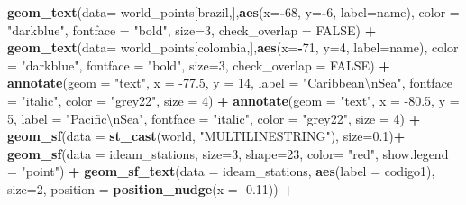 \documentclass[12pt,oneside]{reedthesis}
\newenvironment{Shaded}{\begin{snugshade}}{\end{snugshade}}
\newcommand{\CharTok}[1]{\textcolor[rgb]{0.31,0.60,0.02}{#1}}
\newcommand{\DataTypeTok}[1]{\textcolor[rgb]{0.13,0.29,0.53}{#1}}
\newcommand{\DecValTok}[1]{\textcolor[rgb]{0.00,0.00,0.81}{#1}}
\newcommand{\FloatTok}[1]{\textcolor[rgb]{0.00,0.00,0.81}{#1}}
\newcommand{\KeywordTok}[1]{\textcolor[rgb]{0.13,0.29,0.53}{\textbf{#1}}}
\newcommand{\NormalTok}[1]{#1}
\newcommand{\OperatorTok}[1]{\textcolor[rgb]{0.81,0.36,0.00}{\textbf{#1}}}
\newcommand{\OtherTok}[1]{\textcolor[rgb]{0.56,0.35,0.01}{#1}}
\newcommand{\StringTok}[1]{\textcolor[rgb]{0.31,0.60,0.02}{#1}}
\begin{document}
\begin{Shaded}
\begin{Highlighting}[]
{{{{\StringTok{  }\KeywordTok{geom_text}\NormalTok{(}\DataTypeTok{data=}\NormalTok{ world_points[brazil,],}\KeywordTok{aes}\NormalTok{(}\DataTypeTok{x=}\OperatorTok{-}\DecValTok{68}\NormalTok{, }\DataTypeTok{y=}\OperatorTok{-}\DecValTok{6}\NormalTok{, }\DataTypeTok{label=}\NormalTok{name), }\DataTypeTok{color =} \StringTok{"darkblue"}\NormalTok{, }\DataTypeTok{fontface =} \StringTok{"bold"}\NormalTok{, }\DataTypeTok{size=}\DecValTok{3}\NormalTok{, }\DataTypeTok{check_overlap =} \OtherTok{FALSE}\NormalTok{) }\OperatorTok{+}
\StringTok{  }\KeywordTok{geom_text}\NormalTok{(}\DataTypeTok{data=}\NormalTok{ world_points[colombia,],}\KeywordTok{aes}\NormalTok{(}\DataTypeTok{x=}\OperatorTok{-}\DecValTok{71}\NormalTok{, }\DataTypeTok{y=}\DecValTok{4}\NormalTok{, }\DataTypeTok{label=}\NormalTok{name), }\DataTypeTok{color =} \StringTok{"darkblue"}\NormalTok{, }\DataTypeTok{fontface =} \StringTok{"bold"}\NormalTok{, }\DataTypeTok{size=}\DecValTok{3}\NormalTok{, }\DataTypeTok{check_overlap =} \OtherTok{FALSE}\NormalTok{) }\OperatorTok{+}
\StringTok{  }\KeywordTok{annotate}\NormalTok{(}\DataTypeTok{geom =} \StringTok{"text"}\NormalTok{, }\DataTypeTok{x =} \FloatTok{-77.5}\NormalTok{, }\DataTypeTok{y =} \DecValTok{14}\NormalTok{, }\DataTypeTok{label =} \StringTok{"Caribbean}\CharTok{\textbackslash{}n}\StringTok{Sea"}\NormalTok{, }\DataTypeTok{fontface =} \StringTok{"italic"}\NormalTok{, }\DataTypeTok{color =} \StringTok{"grey22"}\NormalTok{, }\DataTypeTok{size =} \DecValTok{4}\NormalTok{) }\OperatorTok{+}\StringTok{ }
\StringTok{  }\KeywordTok{annotate}\NormalTok{(}\DataTypeTok{geom =} \StringTok{"text"}\NormalTok{, }\DataTypeTok{x =} \FloatTok{-80.5}\NormalTok{, }\DataTypeTok{y =} \DecValTok{5}\NormalTok{, }\DataTypeTok{label =} \StringTok{"Pacific}\CharTok{\textbackslash{}n}\StringTok{Sea"}\NormalTok{, }\DataTypeTok{fontface =} \StringTok{"italic"}\NormalTok{, }\DataTypeTok{color =} \StringTok{"grey22"}\NormalTok{, }\DataTypeTok{size =} \DecValTok{4}\NormalTok{) }\OperatorTok{+}
\StringTok{  }\KeywordTok{geom_sf}\NormalTok{(}\DataTypeTok{data =} \KeywordTok{st_cast}\NormalTok{(world, }\StringTok{"MULTILINESTRING"}\NormalTok{),  }\DataTypeTok{size=}\FloatTok{0.1}\NormalTok{)}\OperatorTok{+}
\StringTok{  }\KeywordTok{geom_sf}\NormalTok{(}\DataTypeTok{data =}\NormalTok{ ideam_stations, }\DataTypeTok{size=}\DecValTok{3}\NormalTok{, }\DataTypeTok{shape=}\DecValTok{23}\NormalTok{, }\DataTypeTok{color=} \StringTok{"red"}\NormalTok{, }\DataTypeTok{show.legend =} \StringTok{"point"}\NormalTok{) }\OperatorTok{+}\StringTok{ }
\StringTok{  }\KeywordTok{geom_sf_text}\NormalTok{(}\DataTypeTok{data =}\NormalTok{ ideam_stations, }\KeywordTok{aes}\NormalTok{(}\DataTypeTok{label =}\NormalTok{ codigo1), }\DataTypeTok{size=}\DecValTok{2}\NormalTok{, }\DataTypeTok{position =} \KeywordTok{position_nudge}\NormalTok{(}\DataTypeTok{x =} \FloatTok{-0.11}\NormalTok{)) }\OperatorTok{+}
}}}}
\end{Highlighting}
\end{Shaded}
\end{document}
